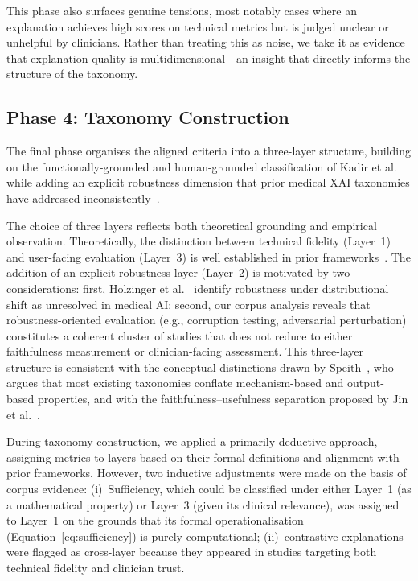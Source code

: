 This phase also surfaces genuine tensions, most notably cases where an
explanation achieves high scores on technical metrics but is judged unclear or
unhelpful by clinicians. Rather than treating this as noise, we take it
as evidence that explanation quality is multidimensional---an insight that
directly informs the structure of the taxonomy.

\subsection{Phase 4: Taxonomy Construction}

The final phase organises the aligned criteria into a three-layer
structure, building on the functionally-grounded and human-grounded
classification of Kadir et al.~\cite{kadir2023evaluation} while adding
an explicit robustness dimension that prior medical XAI taxonomies have
addressed inconsistently~\cite{speith2022review, jin2023guidelines}.

The choice of three layers reflects both theoretical grounding and empirical
observation. Theoretically, the distinction between technical fidelity
(Layer~1) and user-facing evaluation (Layer~3) is well established in
prior frameworks~\cite{jin2023guidelines, kadir2023evaluation}. The
addition of an explicit robustness layer (Layer~2) is motivated by two
considerations: first, Holzinger et al.~\cite{holzinger2022information}
identify robustness under distributional shift as unresolved in medical
AI; second, our corpus analysis reveals that robustness-oriented
evaluation (e.g., corruption testing, adversarial perturbation) constitutes
a coherent cluster of studies that does not reduce to either faithfulness
measurement or clinician-facing assessment. This three-layer structure is
consistent with the conceptual distinctions drawn by Speith~\cite{speith2022review},
who argues that most existing taxonomies conflate mechanism-based and
output-based properties, and with the faithfulness--usefulness separation
proposed by Jin et al.~\cite{jin2023guidelines}.

During taxonomy construction, we applied a primarily deductive approach,
assigning metrics to layers based on their formal definitions and alignment
with prior frameworks. However, two inductive adjustments were made on the
basis of corpus evidence: (i)~Sufficiency, which could be classified under
either Layer~1 (as a mathematical property) or Layer~3 (given its clinical
relevance), was assigned to Layer~1 on the grounds that its formal
operationalisation (Equation~\ref{eq:sufficiency}) is purely computational;
(ii)~contrastive explanations were flagged as cross-layer because they
appeared in studies targeting both technical fidelity and clinician trust.

